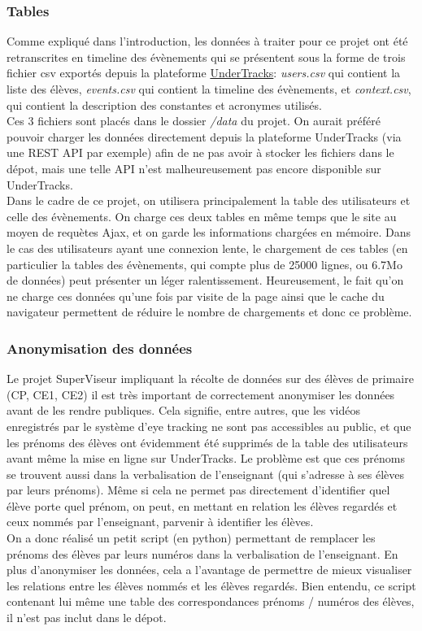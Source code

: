 \documentclass{article}
\begin{document}
\subsubsection{Tables}
Comme expliqué dans l'introduction, les données à traiter pour ce projet ont été retranscrites en timeline des évènements qui se présentent sous la forme de trois fichier csv exportés depuis la plateforme \href{https://undertracks.imag.fr/}{UnderTracks}: \textit{users.csv} qui contient la liste des élèves, \textit{events.csv} qui contient la timeline des évènements, et \textit{context.csv}, qui contient la description des constantes et acronymes utilisés.\\
Ces 3 fichiers sont placés dans le dossier \textit{/data} du projet. On aurait préféré pouvoir charger les données directement depuis la plateforme UnderTracks (via une REST API par exemple) afin de ne pas avoir à stocker les fichiers dans le dépot, mais une telle API n'est malheureusement pas encore disponible sur UnderTracks.\\
Dans le cadre de ce projet, on utilisera principalement la table des utilisateurs et celle des évènements. On charge ces deux tables en même temps que le site au moyen de requètes Ajax, et on garde les informations chargées en mémoire. Dans le cas des utilisateurs ayant une connexion lente, le chargement de ces tables (en particulier la tables des évènements, qui compte plus de 25000 lignes, ou 6.7Mo de données) peut présenter un léger ralentissement. Heureusement, le fait qu'on ne charge ces données qu'une fois par visite de la page ainsi que le cache du navigateur permettent de réduire le nombre de chargements et donc ce problème.

\subsubsection{Anonymisation des données}
Le projet SuperViseur impliquant la récolte de données sur des élèves de primaire (CP, CE1, CE2) il est très important de correctement anonymiser les données avant de les rendre publiques. Cela signifie, entre autres, que les vidéos enregistrés par le système d'eye tracking ne sont pas accessibles au public, et que les prénoms des élèves ont évidemment été supprimés de la table des utilisateurs avant même la mise en ligne sur UnderTracks. Le problème est que ces prénoms se trouvent aussi dans la verbalisation de l'enseignant (qui s'adresse à ses élèves par leurs prénoms). Même si cela ne permet pas directement d'identifier quel élève porte quel prénom, on peut, en mettant en relation les élèves regardés et ceux nommés par l'enseignant, parvenir à identifier les élèves.\\
On a donc réalisé un petit script (en python) permettant de remplacer les prénoms des élèves par leurs numéros dans la verbalisation de l'enseignant. En plus d'anonymiser les données, cela a l'avantage de permettre de mieux visualiser les relations entre les élèves nommés et les élèves regardés. Bien entendu, ce script contenant lui même une table des correspondances prénoms / numéros des élèves, il n'est pas inclut dans le dépot.
\end{document}
